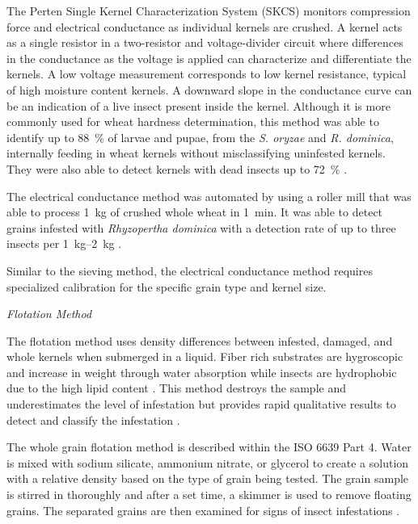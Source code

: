 \documentclass[../Vibro-Acoustic Signatures and Detection Algorithms for Stored Product Insects.tex]{subfiles}
\begin{document}
The Perten Single Kernel Characterization System (SKCS) monitors compression force and electrical conductance as individual kernels are crushed. A kernel acts as a single resistor in a two-resistor and voltage-divider circuit where differences in the conductance as the voltage is applied can characterize and differentiate the kernels. A low voltage measurement corresponds to low kernel resistance, typical of high moisture content kernels. A downward slope in the conductance curve can be an indication of a live insect present inside the kernel. Although it is more commonly used for wheat hardness determination, this method was able to identify up to \SI{88}{\percent} of larvae and pupae, from the \textit{S. oryzae} and \textit{R. dominica}, internally feeding in wheat kernels without misclassifying uninfested kernels. They were also able to detect kernels with dead insects up to \SI{72}{\percent} \cite{t.c.pearsonAUTOMATEDDETECTIONINTERNAL2003, neethirajanDetectionTechniquesStoredProduct2007}.

The electrical conductance method was automated by using a roller mill that was able to process \SI{1}{\kilo\gram} of crushed whole wheat in \SI{1}{\minute}. It was able to detect grains infested with \textit{Rhyzopertha dominica} with a detection rate of up to three insects per \SIrange{1}{2}{\kilo\gram} \cite{t.pearsonDetectionWheatKernels2007, brabecDetectionInternalInsects2010}.

Similar to the sieving method, the electrical conductance method requires specialized calibration for the specific grain type and kernel size.

\newpage
\textit{Flotation Method}

The flotation method uses density differences between infested, damaged, and whole kernels when submerged in a liquid. Fiber rich substrates are hygroscopic and increase in weight through water absorption while insects are hydrophobic due to the high lipid content \cite{germinaraDevelopmentFlotationMethod2010}. This method destroys the sample and underestimates the level of infestation but provides rapid qualitative results to detect and classify the infestation \cite{ISO6639Cereals1986}.

The whole grain flotation method is described within the ISO 6639 Part 4. Water is mixed with sodium silicate, ammonium nitrate, or glycerol to create a solution with a relative density based on the type of grain being tested. The grain sample is stirred in thoroughly and after a set time, a skimmer is used to remove floating grains. The separated grains are then examined for signs of insect infestations \cite{ISO6639Cereals1986}.
\end{document}

